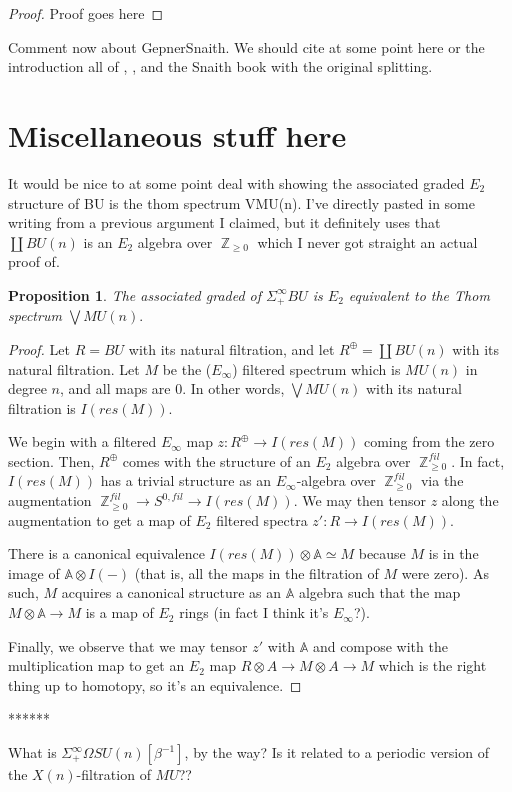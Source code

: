 \documentclass[oneside]{amsart}
\theoremstyle{definition}
\theoremstyle{plain}
\newtheorem{prop}[nul]{Proposition}
\DeclareMathOperator{\Z}{\mathbb{Z}}
\begin{document}
\begin{proof}
Proof goes here
\end{proof}

Comment now about GepnerSnaith.
We should cite at some point here or the introduction all of \cite{SnaithNotMultiplicative},  \cite{GepnerSnaith}, and the Snaith book with the original splitting.

\section{Miscellaneous stuff here}

It would be nice to at some point deal with showing the associated graded $E_2$ structure of BU is the thom spectrum VMU(n).  I've directly pasted in some writing from a previous argument I claimed, but it definitely uses that $\coprod BU(n)$ is an $E_2$ algebra over $\Z _{\geq 0}$ which I never got straight an actual proof of.  

\begin{prop}The associated graded of $\Sigma^{\infty}_+BU$ is $E_2$ equivalent to the Thom spectrum $\bigvee MU(n).$
\end{prop}
\begin{proof}
Let $R = BU$ with its natural filtration, and let $R^{\oplus} = \coprod BU(n)$ with its natural filtration.  Let $M$ be the ($E_\infty$) filtered spectrum which is $MU(n)$ in degree $n$, and all maps are $0$.  In other words, $\bigvee MU(n)$ with its natural filtration is $I(res(M))$.  

We begin with a filtered $E_\infty$ map $z:R^\oplus \to I(res(M))$ coming from the zero section.  Then, $R^\oplus$ comes with the structure of an $E_2$ algebra over $\Z_{\geq 0}^{fil}$.  In fact, $I(res(M))$  has a trivial structure as an $E_\infty$-algebra over $\Z_{\geq 0}^{fil}$ via the augmentation $\Z_{\geq 0}^{fil}\to S^{0,fil} \to I(res(M))$.  We may then tensor $z$ along the augmentation to get a map of $E_2$ filtered spectra $z':R \to I(res(M))$.  

There is a canonical equivalence $I(res(M)) \otimes \mathbb{A} \simeq M$ because $M$ is in the image of $\mathbb{A} \otimes I(-)$ (that is, all the maps in the filtration of $M$ were zero).  As such, $M$ acquires a canonical structure as an $\mathbb{A}$ algebra such that the map $M \otimes \mathbb{A} \to M$ is a map of $E_2$ rings (in fact I think it's $E_\infty$?).  

Finally, we observe that we may tensor $z'$ with $\mathbb{A}$ and compose with the multiplication map to get an $E_2$ map $R\otimes A \to M \otimes A \to M$ which is the right thing up to homotopy, so it's an equivalence.  
\end{proof}

******  

What is $\Sigma^{\infty}_+ \Omega SU(n)[\beta^{-1}]$, by the way?  Is it related to a periodic version of the $X(n)$-filtration of $MU$??


\end{document}
